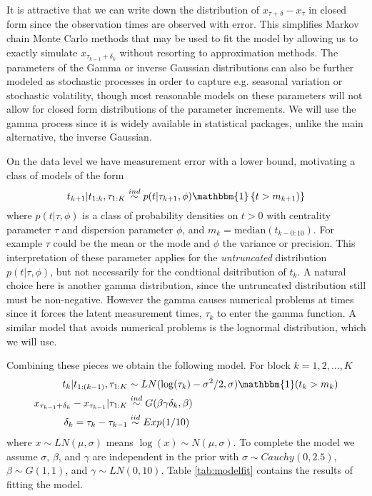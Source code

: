 \documentclass{article}
\begin{document}
It is attractive that we can write down the distribution of $x_{\tau + \delta} - x_\tau$ in closed form since the observation times are observed with error. This simplifies Markov chain Monte Carlo methods that may be used to fit the model by allowing us to exactly simulate $x_{\tau_{k-1} + \delta_k}$ without resorting to approximation methods. The parameters of the Gamma or inverse Gaussian distributions can also be further modeled as stochastic processes in order to capture e.g. seasonal variation or stochastic volatility, though most reasonable models on these parameters will not allow for closed form distributions of the parameter increments. We will use the gamma process since it is widely available in statistical packages, unlike the main alternative, the inverse Gaussian.

On the data level we have measurement error with a lower bound, motivating a class of models of the form 
\[
t_{k+1} |t_{1:k}, \tau_{1:K} \stackrel{ind}{\sim} p(t|\tau_{k+1}, \phi)\mathbbm{1}\left\{t > m_{k+1})\right\}
\]
where $p(t|\tau,\phi)$ is a class of probability densities on $t>0$ with centrality parameter $\tau$ and dispersion parameter $\phi$, and $m_k = \mathrm{median}(t_{k - 0:10})$. For example $\tau$ could be the mean or the mode and $\phi$ the variance or precision. This interpretation of these parameter applies for the {\it untruncated} distribution $p(t|\tau,\phi)$, but not necessarily for the condtional dsitribution of $t_k$. A natural choice here is another gamma distribution, since the untruncated distribution still must be non-negative. However the gamma causes numerical problems at times since it forces the latent measurement times, $\tau_k$ to enter the gamma function. A similar model that avoids numerical problems is the lognormal distribution, which we will use.

Combining these pieces we obtain the following model. For block $k=1,2,\dots,K$
\begin{align*}
t_k|t_{1:(k-1)}, \tau_{1:K} &\sim LN(\log(\tau_k) - \sigma^2/2, \sigma)\mathbbm{1}(t_k > m_k)\\
x_{\tau_{k-1} + \delta_k} - x_{\tau_{k-1}}|\tau_{1:K} & \stackrel{ind}{\sim} G(\beta\gamma\delta_k,\beta)\\
\delta_{k} = \tau_{k} - \tau_{k-1} &\stackrel{iid}{\sim} Exp(1/10)
\end{align*}
where $x\sim LN(\mu,\sigma)$ means $\log(x) \sim N(\mu,\sigma)$. To complete the model we assume $\sigma$, $\beta$, and $\gamma$ are independent in the prior with $\sigma \sim Cauchy(0, 2.5)$, $\beta \sim G(1, 1)$, and $\gamma \sim LN(0, 10)$. Table \ref{tab:modelfit} contains the results of fitting the model.
\end{document}
